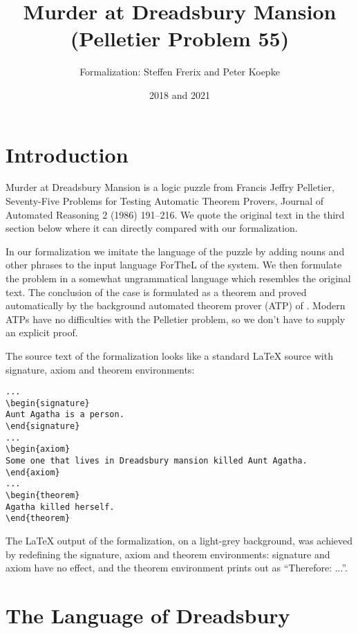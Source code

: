 \documentclass{article}
\title{Murder at Dreadsbury Mansion (Pelletier Problem 55)}
\author{\Naproche{} Formalization: Steffen Frerix and Peter Koepke}
\date{2018 and 2021}
\begin{document}

  \maketitle
\section{Introduction}

Murder at Dreadsbury Mansion is a logic puzzle from 
Francis Jeffry Pelletier, Seventy-Five Problems for Testing
Automatic Theorem Provers, Journal of Automated Reasoning 2 (1986) 191--216.
We quote the original text in the third section below where it can
directly compared with our formalization.

In our formalization we imitate the language of the puzzle by 
adding nouns and other phrases to the input language ForTheL of the \Naproche{} system.
We then formulate the problem in a somewhat ungrammatical language
which resembles the original text.
The conclusion of the case is formulated as a theorem and
proved automatically by the background automated theorem prover (ATP) of \Naproche. Modern
ATPs have no difficulties with the Pelletier problem, so we don't
have to supply an explicit proof.

The source text of the formalization looks like a standard \LaTeX{} source
with signature, axiom and theorem environments:

\begin{verbatim}
...
\begin{signature}
Aunt Agatha is a person.
\end{signature}
...
\begin{axiom}
Some one that lives in Dreadsbury mansion killed Aunt Agatha.
\end{axiom}
...
\begin{theorem}
Agatha killed herself.
\end{theorem}
\end{verbatim}

The \LaTeX{} output of the formalization, on a light-grey background,  was 
achieved by redefining the signature,
axiom and theorem environments: signature and axiom have no effect, and
the theorem environment prints out as ``Therefore: ...''.

\section{The Language of Dreadsbury}
\end{document}
